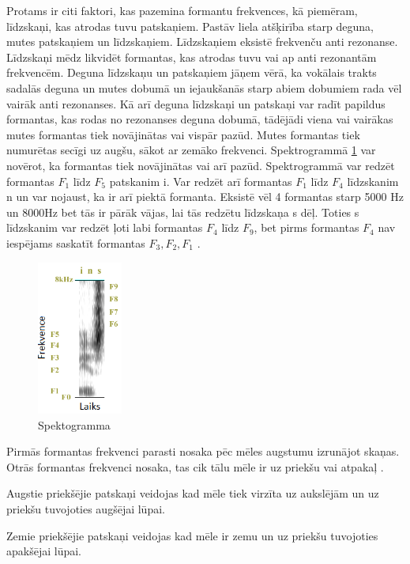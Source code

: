 \documentclass[12pt,paper=A4]{report}
\begin{document}
Protams ir citi faktori, kas pazemina formantu frekvences, kā piemēram, līdzskaņi, kas atrodas tuvu patskaņiem. Pastāv liela atšķirība starp deguna, mutes patskaņiem un līdzskaņiem. Līdzskaņiem eksistē frekvenču anti rezonanse. Līdzskaņi mēdz likvidēt formantas, kas atrodas tuvu vai ap  anti rezonantām frekvencēm. Deguna līdzskaņu un patskaņiem jāņem vērā, ka vokālais trakts sadalās deguna un mutes dobumā un iejaukšanās starp abiem dobumiem rada vēl vairāk anti rezonanses. Kā arī deguna līdzskaņi un patskaņi var radīt papildus formantas, kas rodas no rezonanses deguna dobumā, tādējādi viena vai vairākas mutes formantas tiek novājinātas vai vispār pazūd. Mutes formantas tiek numurētas secīgi uz augšu, sākot ar zemāko frekvenci. Spektrogrammā \ref{formantas2} var novērot, ka formantas tiek novājinātas vai arī pazūd. Spektrogrammā var redzēt formantas $F_1$ līdz $F_5$ patskanim i. Var redzēt arī formantas $F_1$ līdz $F_4$ līdzskanim n un var nojaust, ka ir arī piektā formanta. Eksistē vēl 4 formantas starp 5000 Hz  un 8000Hz bet tās ir pārāk vājas, lai tās redzētu līdzskaņa s dēļ. Toties s līdzskanim var redzēt ļoti labi formantas $F_4$ līdz $F_9$, bet pirms formantas $F_4$ nav iespējams saskatīt formantas $F_3, F_2, F_1$ \cite{http://person2.sol.lu.se/SidneyWood/praate/whatform.html}. 
\begin{figure}[H] \centering
\includegraphics[width=0.25\textwidth]{wave} 
\caption{Spektogramma \cite{DynamicTimeWrapping}}  \label{formantas2} 
\end{figure}

 Pirmās formantas frekvenci parasti nosaka pēc mēles augstumu izrunājot skaņas. Otrās formantas frekvenci nosaka, tas cik tālu mēle ir uz priekšu vai atpakaļ \cite{edist}.
 
Augstie priekšējie patskaņi veidojas kad mēle tiek virzīta uz aukslējām un uz priekšu tuvojoties augšējai lūpai.

Zemie priekšējie patskaņi veidojas kad mēle ir zemu un uz priekšu tuvojoties apakšējai lūpai.
\end{document}
